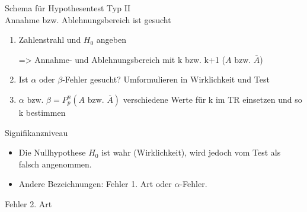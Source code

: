 \documentclass[paper=a6,landscape,ngerman,twoside=true,fontsize=12pt]{scrartcl}
\begin{document}
\begin{frage}
	Schema für Hypothesentest Typ II\\
	Annahme bzw. Ablehnungsbereich ist gesucht
	
\end{frage}
\begin{antwort}
	\begin{enumerate}
		\item Zahlenstrahl und $H_0$ angeben
		
		=> Annahme- und Ablehnungsbereich mit k bzw. k+1 ($A \text{ bzw. }\overline{A}$)	
		\item Ist  $\alpha \text{ oder }\beta$-Fehler gesucht? Umformulieren in Wirklichkeit und Test
		\item $\alpha \text{ bzw. }\beta=P^n_p(A\text{ bzw. }\overline{A})$ verschiedene Werte für k im TR einsetzen und so k bestimmen
	\end{enumerate}
	
\end{antwort}	
\begin{frage}
	Signifikanzniveau
	
\end{frage}
\begin{antwort}\large
	\begin{itemize}
		\item Die Nullhypothese $H_0$ ist wahr (Wirklichkeit), wird jedoch vom Test als falsch angenommen.
		\item Andere Bezeichnungen: Fehler 1. Art oder $\alpha$-Fehler.	
	\end{itemize}
	\begin{center}
	\end{center}
\end{antwort}
\begin{frage}
	Fehler 2. Art
	
\end{frage}
\end{document}
